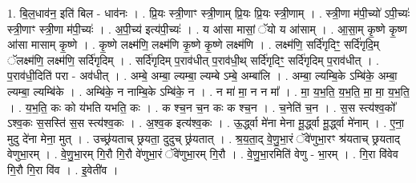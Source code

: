 \documentclass[17pt]{extarticle}
\begin{document}
1. बि॒ल॒धाव॑न॒ इति॑ बिल - धाव॑नः । . प्रि॒यः स्त्री॒णाꣳ स्त्री॒णाम् प्रि॒यः प्रि॒यः स्त्री॒णाम् । . स्त्री॒णा म॑पी॒च्यो॑ ऽपी॒च्यः॑ स्त्री॒णाꣳ स्त्री॒णा म॑पी॒च्यः॑ । . अ॒पी॒च्य॑ इत्य॑पी॒च्यः॑ । . य आ॑सा मासां॒ ॅयो य आ॑साम् । . आ॒सा॒म् कृ॒ष्णे कृ॒ष्ण आ॑सा मासाम् कृ॒ष्णे । . कृ॒ष्णे लक्ष्म॑णि॒ लक्ष्म॑णि कृ॒ष्णे कृ॒ष्णे लक्ष्म॑णि । . लक्ष्म॑णि॒ सर्दि॑गृदिꣳ॒॒ सर्दि॑गृदि॒म् ॅलक्ष्म॑णि॒ लक्ष्म॑णि॒ सर्दि॑गृदिम् । . सर्दि॑गृदिम् प॒राव॑धीत् प॒राव॑धी॒थ् सर्दि॑गृदिꣳ॒॒ सर्दि॑गृदिम् प॒राव॑धीत् । . प॒राव॑धी॒दिति॑ परा - अव॑धीत् । . अम्बे॒ अम्बा॒ ल्यम्बा॒ ल्यम्बे ऽम्बे॒ अम्बा॑लि । . अम्बा॒ ल्यम्बि॒के ऽम्बि॑के॒ अम्बा॒ ल्यम्बा॒ ल्यम्बि॑के । . अम्बि॑के॒ न नाम्बि॒के ऽम्बि॑के॒ न । . न मा॑ मा॒ न न मा᳚ । . मा॒ य॒भ॒ति॒ य॒भ॒ति॒ मा॒ मा॒ य॒भ॒ति॒ । . य॒भ॒ति॒ कः को य॑भति यभति॒ कः । . क श्च॒न च॒न कः क श्च॒न । . च॒नेति॑ च॒न । . स॒स स्त्य॑श्व॒को᳚ ऽश्व॒कः स॒सस्ति॑ स॒स स्त्य॑श्व॒कः । . अ॒श्व॒क इत्य॑श्व॒कः । . ऊ॒र्द्ध्वा मे॑ना मेना मू॒र्द्ध्वा मू॒र्द्ध्वा मे॑नाम् । . ए॒ना॒ मुदु दे॑ना मेना॒ मुत् । . उच्छ्र॑यताच् छ्रयता॒ दुदुच् छ्र॑यतात् । . श्र॒य॒ता॒द् वे॒णु॒भा॒रं ॅवे॑णुभा॒रꣳ श्र॑यताच् छ्रयताद् वेणुभा॒रम् । . वे॒णु॒भा॒रम् गि॒रौ गि॒रौ वे॑णुभा॒रं ॅवे॑णुभा॒रम् गि॒रौ । . वे॒णु॒भा॒रमिति॑ वेणु - भा॒रम् । . गि॒रा वि॑वेव गि॒रौ गि॒रा वि॑व । . इ॒वेती॑व । \newline
\end{document}
